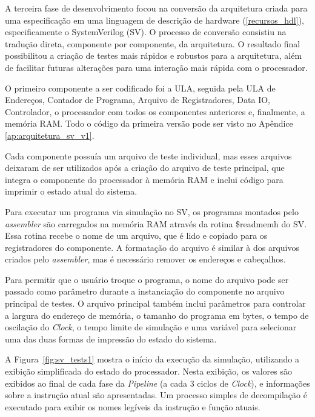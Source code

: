 \documentclass[
	12pt,				%
	openright,			%
	oneside,			%
	a4paper,			%
	english,			%
	french,				%
	spanish,			%
	brazil,				%
	]{abntex2}
\begin{document}
A terceira fase de desenvolvimento focou na conversão da arquitetura criada para uma especificação em uma linguagem de descrição de hardware (\ref{recursos_hdl}), especificamente o SystemVerilog (SV). O processo de conversão consistiu na tradução direta, componente por componente, da arquitetura. O resultado final possibilitou a criação de testes mais rápidos e robustos para a arquitetura, além de facilitar futuras alterações para uma interação mais rápida com o processador.

O primeiro componente a ser codificado foi a ULA, seguida pela ULA de Endereços, Contador de Programa, Arquivo de Registradores, Data IO, Controlador, o processador com todos os componentes anteriores e, finalmente, a memória RAM. Todo o código da primeira versão pode ser visto no Apêndice \ref{ap:arquitetura_sv_v1}.

Cada componente possuía um arquivo de teste individual, mas esses arquivos deixaram de ser utilizados após a criação do arquivo de teste principal, que integra o componente do processador à memória RAM e inclui código para imprimir o estado atual do sistema.

Para executar um programa via simulação no SV, os programas montados pelo \textit{assembler} são carregados na memória RAM através da rotina \$readmemh do SV. Essa rotina recebe o nome de um arquivo, que é lido e copiado para os registradores do componente. A formatação do arquivo é similar à dos arquivos criados pelo \textit{assembler}, mas é necessário remover os endereços e cabeçalhos.

Para permitir que o usuário troque o programa, o nome do arquivo pode ser passado como parâmetro durante a instanciação do componente no arquivo principal de testes. O arquivo principal também inclui parâmetros para controlar a largura do endereço de memória, o tamanho do programa em bytes, o tempo de oscilação do \textit{Clock}, o tempo limite de simulação e uma variável para selecionar uma das duas formas de impressão do estado do sistema.

A Figura~\ref{fig:sv_tests1} mostra o início da execução da simulação, utilizando a exibição simplificada do estado do processador. Nesta exibição, os valores são exibidos ao final de cada fase da \textit{Pipeline} (a cada 3 ciclos de \textit{Clock}), e informações sobre a instrução atual são apresentadas. Um processo simples de decompilação é executado para exibir os nomes legíveis da instrução e função atuais.
\end{document}
